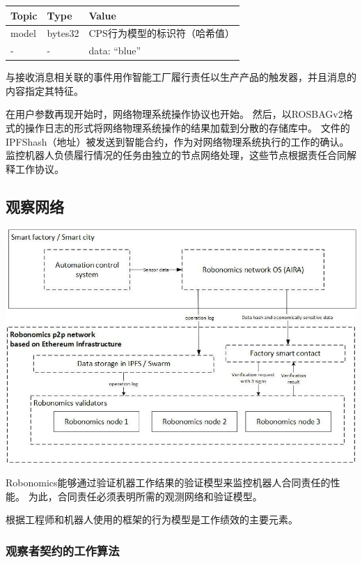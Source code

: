 \documentclass[UTF8]{article}
\begin{document}
\begin{tabular}{ |l |l |l }
 \textbf{Topic} & \textbf{Type} & \textbf{Value} \\ 
 \hline
 model & bytes32 & CPS行为模型的标识符（哈希值） \\ 
 - &  - & data: “blue” \\ 
\end{tabular}

与接收消息相关联的事件用作智能工厂履行责任以生产产品的触发器，并且消息的内容指定其特征。

在用户参数再现开始时，网络物理系统操作协议也开始。 然后，以ROSBAGv2格式的操作日志的形式将网络物理系统操作的结果加载到分散的存储库中。 文件的IPFShash（地址）被发送到智能合约，作为对网络物理系统执行的工作的确认。 监控机器人负债履行情况的任务由独立的节点网络处理，这些节点根据责任合同解释工作协议。

\subsection{观察网络}

\includegraphics[width=1\textwidth]{app-3.png} 

Robonomics能够通过验证机器工作结果的验证模型来监控机器人合同责任的性能。 为此，合同责任必须表明所需的观测网络和验证模型。

根据工程师和机器人使用的框架的行为模型是工作绩效的主要元素。

\subsubsection{观察者契约的工作算法}
\end{document}

